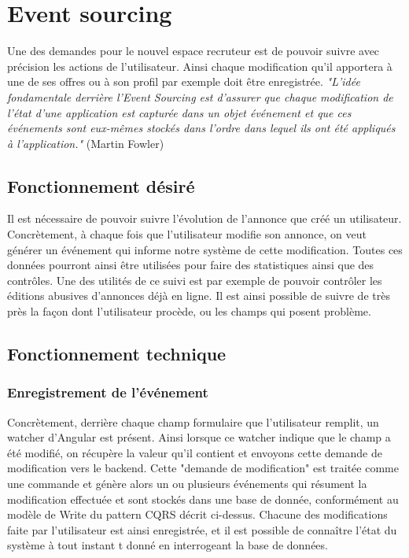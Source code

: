 \section{Event sourcing}
Une des demandes pour le nouvel espace recruteur est de pouvoir suivre avec précision les actions de l'utilisateur.
Ainsi chaque modification qu'il apportera à une de ses offres ou à son profil par exemple doit être enregistrée.
\textit{"L'idée fondamentale derrière l'Event Sourcing est d'assurer que chaque modification de l'état d'une application est capturée dans un objet événement et que ces événements sont eux-mêmes stockés dans l'ordre dans lequel ils ont été appliqués à l'application."} (Martin Fowler)
\subsection{Fonctionnement désiré}
\label{sub:Fonctionnement desire}
Il est nécessaire de pouvoir suivre l'évolution de l'annonce que créé un utilisateur.
Concrètement, à chaque fois que l'utilisateur modifie son annonce, on veut générer un événement qui informe notre système de cette modification.
Toutes ces données pourront ainsi être utilisées pour faire des statistiques ainsi que des contrôles.
Une des utilités de ce suivi est par exemple de pouvoir contrôler les éditions abusives d'annonces déjà en ligne.
Il est ainsi possible de suivre de très près la façon dont l'utilisateur procède, ou les champs qui posent problème.

\subsection{Fonctionnement technique}
\subsubsection{Enregistrement de l'événement}
\label{subs:Enregistrement de l'evenement}
Concrètement, derrière chaque champ formulaire que l'utilisateur remplit, un watcher d'Angular est présent.
Ainsi lorsque ce watcher indique que le champ a été modifié, on récupère la valeur qu'il contient et envoyons cette demande de modification vers le backend.
Cette "demande de modification" est traitée comme une commande et génère alors un ou plusieurs événements qui résument la modification effectuée et sont stockés dans une base de donnée, conformément au modèle de Write du pattern CQRS décrit ci-dessus.
Chacune des modifications faite par l'utilisateur est ainsi enregistrée, et il est possible de connaître l'état du système à tout instant t donné en interrogeant la base de données.
